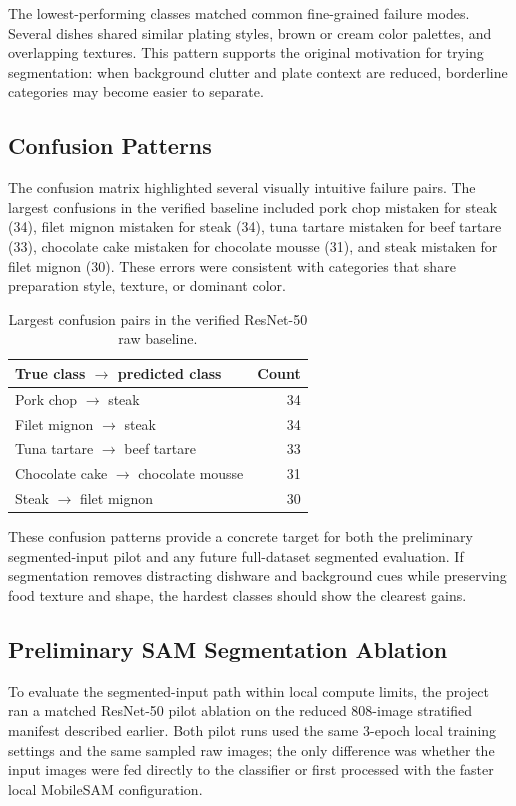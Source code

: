 \documentclass[sigconf,nonacm,11pt]{acmart}
\begin{document}
The lowest-performing classes matched common fine-grained failure modes. Several dishes shared similar plating styles, brown or cream color palettes, and overlapping textures. This pattern supports the original motivation for trying segmentation: when background clutter and plate context are reduced, borderline categories may become easier to separate.

\subsection{Confusion Patterns}
The confusion matrix highlighted several visually intuitive failure pairs. The largest confusions in the verified baseline included pork chop mistaken for steak (34), filet mignon mistaken for steak (34), tuna tartare mistaken for beef tartare (33), chocolate cake mistaken for chocolate mousse (31), and steak mistaken for filet mignon (30). These errors were consistent with categories that share preparation style, texture, or dominant color.

\begin{table}
  \caption{Largest confusion pairs in the verified ResNet-50 raw baseline.}
  \label{tab:confusions}
  \begin{tabular}{lr}
    \toprule
    True class $\rightarrow$ predicted class & Count \\
    \midrule
    Pork chop $\rightarrow$ steak & 34 \\
    Filet mignon $\rightarrow$ steak & 34 \\
    Tuna tartare $\rightarrow$ beef tartare & 33 \\
    Chocolate cake $\rightarrow$ chocolate mousse & 31 \\
    Steak $\rightarrow$ filet mignon & 30 \\
    \bottomrule
  \end{tabular}
\end{table}

These confusion patterns provide a concrete target for both the preliminary segmented-input pilot and any future full-dataset segmented evaluation. If segmentation removes distracting dishware and background cues while preserving food texture and shape, the hardest classes should show the clearest gains.

\subsection{Preliminary SAM Segmentation Ablation}
To evaluate the segmented-input path within local compute limits, the project ran a matched ResNet-50 pilot ablation on the reduced 808-image stratified manifest described earlier. Both pilot runs used the same 3-epoch local training settings and the same sampled raw images; the only difference was whether the input images were fed directly to the classifier or first processed with the faster local MobileSAM configuration.
\end{document}
